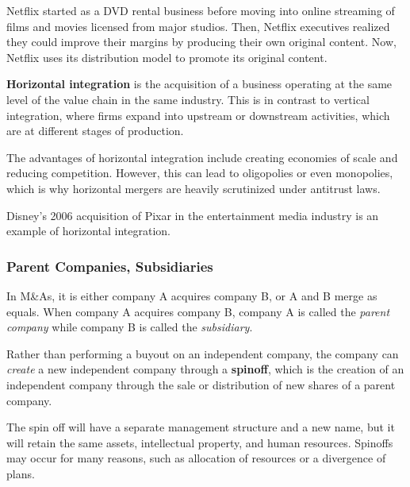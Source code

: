 \documentclass{article}
\begin{document}
      \begin{example}[Netflix]
        Netflix started as a DVD rental business before moving into online streaming of films and movies licensed from major studios. Then, Netflix executives realized they could improve their margins by producing their own original content. Now, Netflix uses its distribution model to promote its original content. 
      \end{example}

      \begin{definition}
        \textbf{Horizontal integration} is the acquisition of a business operating at the same level of the value chain in the same industry. This is in contrast to vertical integration, where firms expand into upstream or downstream activities, which are at different stages of production. 

        The advantages of horizontal integration include creating economies of scale and reducing competition. However, this can lead to oligopolies or even monopolies, which is why horizontal mergers are heavily scrutinized under antitrust laws. 
      \end{definition}

      \begin{example}
        Disney's 2006 acquisition of Pixar in the entertainment media industry is an example of horizontal integration. 
      \end{example}

    \subsubsection{Parent Companies, Subsidiaries}

      In M\&As, it is either company A acquires company B, or A and B merge as equals. When company A acquires company B, company A is called the \textit{parent company} while company B is called the \textit{subsidiary}. 

      \begin{definition}[Spinoff]
        Rather than performing a buyout on an independent company, the company can \textit{create} a new independent company through a \textbf{spinoff}, which is the creation of an independent company through the sale or distribution of new shares of a parent company. 

        The spin off will have a separate management structure and a new name, but it will retain the same assets, intellectual property, and human resources. Spinoffs may occur for many reasons, such as allocation of resources or a divergence of plans. 
      \end{definition}
\end{document}
